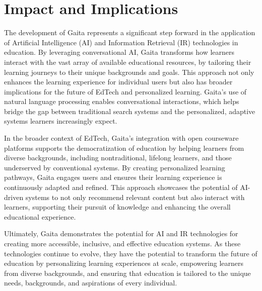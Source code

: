 \section{Impact and Implications}


The development of Gaita represents a significant step forward in the application of Artificial Intelligence (AI) and Information Retrieval (IR) technologies in education. By leveraging conversational AI, Gaita transforms how learners interact with the vast array of available educational resources, by tailoring their learning journeys to their unique backgrounds and goals. This approach not only enhances the learning experience for individual users but also has broader implications for the future of EdTech and personalized learning. Gaita’s use of natural language processing enables conversational interactions, which helps bridge the gap between traditional search systems and the personalized, adaptive systems learners increasingly expect.

In the broader context of EdTech, Gaita’s integration with open courseware platforms supports the democratization of education by helping learners from diverse backgrounds, including nontraditional, lifelong learners, and those underserved by conventional systems. By creating personalized learning pathways, Gaita engages users and ensures their learning experience is continuously adapted and refined. This approach showcases the potential of AI-driven systems to not only recommend relevant content but also interact with learners, supporting their pursuit of knowledge and enhancing the overall educational experience.

Ultimately, Gaita demonstrates the potential for AI and IR technologies for creating more accessible, inclusive, and effective education systems. As these technologies continue to evolve, they have the potential to transform the future of education by personalizing learning experiences at scale, empowering learners from diverse backgrounds, and ensuring that education is tailored to the unique needs, backgrounds, and aspirations of every individual.